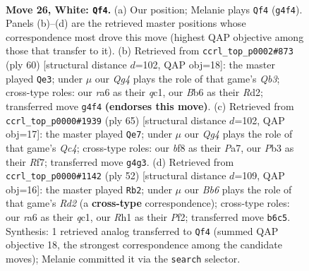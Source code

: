 \documentclass[11pt]{article}
\begin{document}
\clearpage

\begin{figure}[p]\centering
\begin{subfigure}{0.46\textwidth}\centering
\resizebox{\linewidth}{!}{%
\newchessgame
\chessboard[
  setfen={1k3b1r/1p2pp1n/rB1p2p1/1b6/3PP1Q1/1P2RP2/6PP/1K5R w - - 4 26},
  showmover=false,
  pgfstyle=straightmove, color=movearrow, markmove={g4-f4}
]}
\caption{}
\end{subfigure}\hfill
\begin{subfigure}{0.46\textwidth}\centering
\resizebox{\linewidth}{!}{%
\newchessgame
\chessboard[
  setfen={6k1/4pr1p/p2p2p1/1p1P4/6P1/1Q5P/PP1R1PK1/2q5 w - - 5 31},
  showmover=false,
  pgfstyle=straightmove, color=movearrow, markmove={b3-e3}
]}
\caption{}
\end{subfigure}
\\[4pt]
\begin{subfigure}{0.46\textwidth}\centering
\resizebox{\linewidth}{!}{%
\newchessgame
\chessboard[
  setfen={6k1/p2p1r2/1pp2b1Q/2q1pP2/2P1P3/P4B2/1P6/1K3R2 b - - 10 33},
  showmover=false,
  pgfstyle=straightmove, color=movearrow, markmove={c5-e7}
]}
\caption{}
\end{subfigure}\hfill
\begin{subfigure}{0.46\textwidth}\centering
\resizebox{\linewidth}{!}{%
\newchessgame
\chessboard[
  setfen={2r3k1/p4p2/1p2b1pp/3p4/3Q2P1/1P1BP2P/P2R1PK1/2q5 w - - 0 27},
  showmover=false,
  pgfstyle=straightmove, color=movearrow, markmove={d2-b2}
]}
\caption{}
\end{subfigure}
\caption{\textbf{Move 26, White: \texttt{Qf4}.} (a) Our position; Melanie plays \texttt{Qf4} (\texttt{g4f4}). Panels (b)--(d) are the retrieved master positions whose correspondence most drove this move (highest QAP objective among those that transfer to it). (b) Retrieved from \texttt{ccrl\_top\_p0002\#873} (ply 60) [structural distance $d$=102, QAP obj=18]: the master played \texttt{Qe3}; under $\mu$ our \emph{Qg4} plays the role of that game's \emph{Qb3}; cross-type roles: our \emph{r}a6 as their \emph{q}c1, our \emph{B}b6 as their \emph{R}d2; transferred move \texttt{g4f4} \textbf{(endorses this move)}. (c) Retrieved from \texttt{ccrl\_top\_p0000\#1939} (ply 65) [structural distance $d$=102, QAP obj=17]: the master played \texttt{Qe7}; under $\mu$ our \emph{Qg4} plays the role of that game's \emph{Qc4}; cross-type roles: our \emph{b}f8 as their \emph{P}a7, our \emph{P}b3 as their \emph{R}f7; transferred move \texttt{g4g3}. (d) Retrieved from \texttt{ccrl\_top\_p0000\#1142} (ply 52) [structural distance $d$=109, QAP obj=16]: the master played \texttt{Rb2}; under $\mu$ our \emph{Bb6} plays the role of that game's \emph{Rd2} (a \textbf{cross-type} correspondence); cross-type roles: our \emph{r}a6 as their \emph{q}c1, our \emph{R}h1 as their \emph{P}f2; transferred move \texttt{b6c5}. Synthesis: 1 retrieved analog transferred to \texttt{Qf4} (summed QAP objective 18, the strongest correspondence among the candidate moves); Melanie committed it via the \texttt{search} selector.}
\label{fig:thought-m50}
\end{figure}
\end{document}
